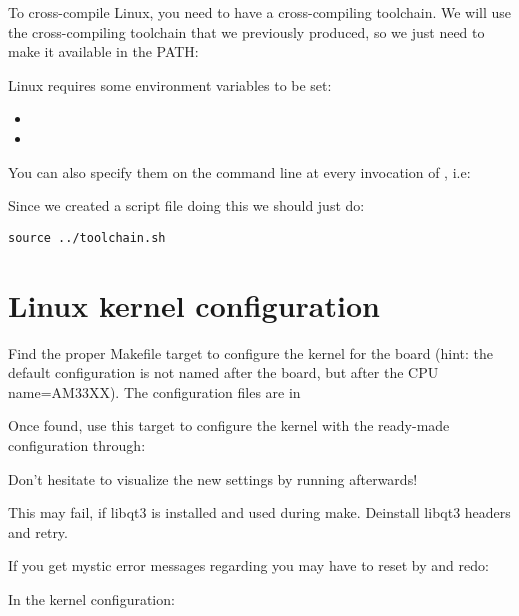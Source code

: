 To cross-compile Linux, you need to have a cross-compiling
toolchain. We will use the cross-compiling toolchain that we
previously produced, so we just need to make it available in the PATH:

Linux requires some environment variables to be set:

\begin{itemize}
\item {}
\item {}
\end{itemize}

You can also specify them on the command line at every invocation of
, i.e: 


Since we created a script file doing this we should just do:

\begin{verbatim}
source ../toolchain.sh
\end{verbatim}

\section{Linux kernel configuration}

Find the proper Makefile target to configure the kernel for the \devboard board 
(hint: the default configuration is not named after the board, but after the CPU
name=AM33XX). The configuration files are in 

Once found, use this target to configure the kernel with the
ready-made configuration through:


Don't hesitate to visualize the new settings by running
 afterwards!

This may fail, if libqt3 is installed and used during make.
Deinstall libqt3 headers and retry.

If you get mystic error messages regarding 
you may have to reset by  and redo:


In the kernel configuration:

